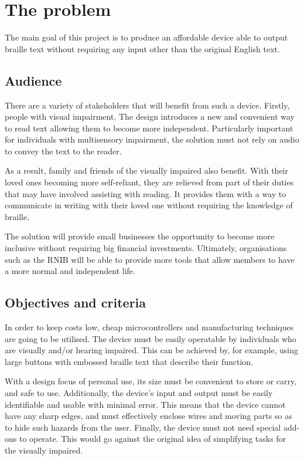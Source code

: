 \section{The problem}
The main goal of this project is to produce an affordable device able to output braille text without requiring any input other than the original English text.

\subsection{Audience}
There are a variety of stakeholders that will benefit from such a device.
Firstly, people with visual impairment.
The design introduces a new and convenient way to read text allowing them to become more independent.
Particularly important for individuals with multisensory impairment, the solution must not rely on audio to convey the text to the reader.

As a result, family and friends of the visually impaired also benefit.
With their loved ones becoming more self-reliant, they are relieved from part of their duties that may have involved assisting with reading.
It provides them with a way to communicate in writing with their loved one without requiring the knowledge of braille.

The solution will provide small businesses the opportunity to become more inclusive without requiring big financial investments.
Ultimately, organisations such as the RNIB will be able to provide more tools that allow members to have a more normal and independent life.

\subsection{Objectives and criteria}
In order to keep costs low, cheap microcontrollers and manufacturing techniques are going to be utilised.
The device must be easily operatable by individuals who are visually and/or hearing impaired.
This can be achieved by, for example, using large buttons with embossed braille text that describe their function.

With a design focus of personal use, its size must be convenient to store or carry, and safe to use.
Additionally, the device's input and output must be easily identifiable and usable with minimal error.
This means that the device cannot have any sharp edges, and must effectively enclose wires and moving parts so as to hide such hazards from the user.
Finally, the device must not need special add-ons to operate.
This would go against the original idea of simplifying tasks for the visually impaired.
 

